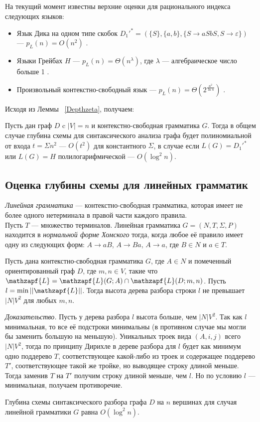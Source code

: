 \documentclass{spbau-diploma}
\begin{document}
На текущий момент известны верхние оценки для рационального индекса следующих языков:
\begin{itemize}
	\item Язык Дика  на одном типе скобок $D_1'^* = (\{S\}, \{a, b\}, \{S \rightarrow aSbS, S \rightarrow \varepsilon\})$ --- $p_L(n) = O(n^2)$ \cite{Dyck1}.
	\item Языки Грейбах $H$ --- $p_L(n) = \Theta(n^\lambda)$, где  $\lambda$ --- алгебраическое число больше 1 \cite{GreibRat}.
	\item Произвольный контекстно-свободный язык --- $p_L(n) = \Theta(2^ {\frac{n^2}{\ln n}})$ \cite{CFRat}.
\end{itemize}
Исходя из Леммы ~\ref{Depthzeta}, получаем:
\begin{corollaryrus} Пусть дан граф $D$ c $|V|=n$ и контекстно-свободная грамматика $G$. Тогда в общем случае глубина схемы для синтаксического анализа графа будет полиномиальной от входа $t = \Sigma n^2$ --- $O(t^2)$ для константного $\Sigma$, в случае если $L(G) = D_1'^*$ или $L(G) = H$ полилогарифмической  --- $O(\log^2 n)$. 
\end{corollaryrus}

\subsection{Оценка глубины схемы для линейных грамматик}
\textit{Линейная грамматика} --- контекстно-свободная грамматика, которая имеет не более одного нетерминала в правой части каждого правила. 
\\Пусть $T$ --- множество терминалов. Линейная грамматика $G = (N, T, \Sigma, P)$ находится в \textit{нормальной форме Хомского} тогда, когда любое её правило имеет  одну из следующих форм: $A \rightarrow aB$, $A \rightarrow Ba$, $A \rightarrow a$, где $B \in N$ и $a \in T$.
\begin{lemmarus}\label{Heightlem} Пусть дана контекстно-свободная грамматика $G$, где $A \in N$  и помеченный ориентированный граф $D$, где $m, n \in V$, такие что  $\mathzapf{L} = \mathzapf{L}(G; A) \cap  \mathzapf{L}(D; m, n)$. Пусть $l = \min ||\mathzapf{L}||$. Тогда высота дерева разбора строки  $l$ не превышает $|N|V^2$ для любых  $m, n$. 
\end{lemmarus}
\textit{Доказательство.} Пусть у дерева разбора $l$ высота больше, чем $|N|V^2$. Так как $l$ минимальная, то все её подстроки минимальны (в противном случае мы могли бы заменить большую на меньшую). Уникальных троек вида $(A, i, j)$ всего $|N|V^2$, тогда по принципу Дирихле в дереве разбора для $l$ будет как минимум одно поддерево $T$, соответствующее какой-либо из троек  и  содержащее поддерево $T'$, соответствующее такой же тройке, но выводящее строку длиной меньше. Тогда заменив  $T$ на $T'$ получим строку длиной меньше, чем $l$. Но по условию $l$ --- минимальная, получаем противоречие. 
\begin{theoremrus} 
Глубина схемы синтаксического разбора графа $D$ на $n$ вершинах для случая линейной грамматики $G$ равна $O(\log^2 n)$.
\end{theoremrus}
\end{document}
